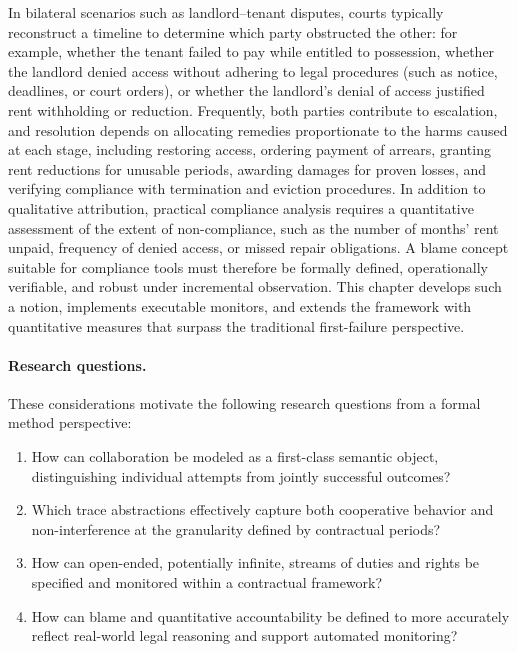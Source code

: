 \documentclass{article}
\begin{document}
In bilateral scenarios such as landlord–tenant disputes, courts typically reconstruct a timeline to determine which party obstructed the other: for example, whether the tenant failed to pay while entitled to possession, whether the landlord denied access without adhering to legal procedures (such as notice, deadlines, or court orders), or whether the landlord's denial of access justified rent withholding or reduction. Frequently, both parties contribute to escalation, and resolution depends on allocating remedies proportionate to the harms caused at each stage, including restoring access, ordering payment of arrears, granting rent reductions for unusable periods, awarding damages for proven losses, and verifying compliance with termination and eviction procedures. In addition to qualitative attribution, practical compliance analysis requires a quantitative assessment of the extent of non-compliance, such as the number of months' rent unpaid, frequency of denied access, or missed repair obligations. A blame concept suitable for compliance tools must therefore be formally defined, operationally verifiable, and robust under incremental observation. This chapter develops such a notion, implements executable monitors, and extends the framework with quantitative measures that surpass the traditional first-failure perspective.



\paragraph{Research questions.}

These considerations motivate the following research questions from a formal method perspective:

\begin{enumerate}

\item How can collaboration be modeled as a first-class semantic object, distinguishing individual attempts from jointly successful outcomes?

\item Which trace abstractions effectively capture both cooperative behavior and non-interference at the granularity defined by contractual periods?

\item How can open-ended, potentially infinite, streams of duties and rights be specified and monitored within a contractual framework?

\item How can blame and quantitative accountability be defined to more accurately reflect real-world legal reasoning and support automated monitoring?

\end{enumerate}
\end{document}
